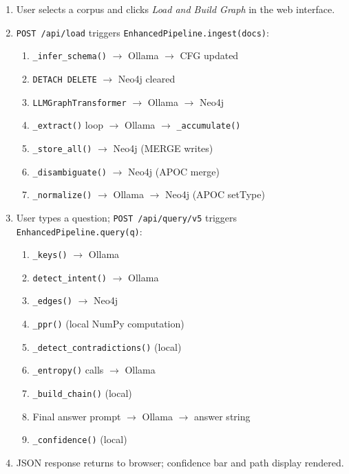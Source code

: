 \begin{enumerate}
    \item User selects a corpus and clicks \emph{Load and Build Graph} in the web interface.
    \item \texttt{POST /api/load} triggers \texttt{EnhancedPipeline.ingest(docs)}:
    \begin{enumerate}
        \item \texttt{\_infer\_schema()} $\rightarrow$ Ollama $\rightarrow$ CFG updated
        \item \texttt{DETACH DELETE} $\rightarrow$ Neo4j cleared
        \item \texttt{LLMGraphTransformer} $\rightarrow$ Ollama $\rightarrow$ Neo4j
        \item \texttt{\_extract()} loop $\rightarrow$ Ollama $\rightarrow$ \texttt{\_accumulate()}
        \item \texttt{\_store\_all()} $\rightarrow$ Neo4j (MERGE writes)
        \item \texttt{\_disambiguate()} $\rightarrow$ Neo4j (APOC merge)
        \item \texttt{\_normalize()} $\rightarrow$ Ollama $\rightarrow$ Neo4j (APOC setType)
    \end{enumerate}
    \item User types a question; \texttt{POST /api/query/v5} triggers \texttt{EnhancedPipeline.query(q)}:
    \begin{enumerate}
        \item \texttt{\_keys()} $\rightarrow$ Ollama
        \item \texttt{detect\_intent()} $\rightarrow$ Ollama
        \item \texttt{\_edges()} $\rightarrow$ Neo4j
        \item \texttt{\_ppr()} (local NumPy computation)
        \item \texttt{\_detect\_contradictions()} (local)
        \item \texttt{\_entropy()} calls $\rightarrow$ Ollama
        \item \texttt{\_build\_chain()} (local)
        \item Final answer prompt $\rightarrow$ Ollama $\rightarrow$ answer string
        \item \texttt{\_confidence()} (local)
    \end{enumerate}
    \item JSON response returns to browser; confidence bar and path display rendered.
\end{enumerate}

